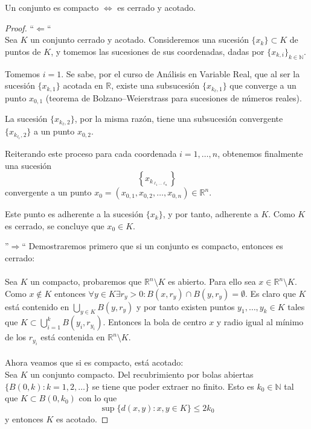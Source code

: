 \begin{teorema}
    Un conjunto es compacto $\iff$ es cerrado y acotado.
\end{teorema}
\begin{proof}
    ``$\Leftarrow$`` \\
    Sea \( K \) un conjunto cerrado y acotado. Consideremos una sucesión \( \{x_k\} \subset K \) de puntos de \( K \), y tomemos las sucesiones de sus coordenadas, dadas por \( \{x_{k,i}\}_{k \in \mathbb{N}} \). 

    Tomemos \( i = 1 \). Se sabe, por el curso de Análisis en Variable Real, que al ser la sucesión \( \{x_{k,1}\} \) acotada en \( \mathbb{R} \), existe una subsucesión \( \{x_{k_\ell,1}\} \) que converge a un punto \( x_{0,1} \) (teorema de Bolzano–Weierstrass para sucesiones de números reales).

    La sucesión \( \{x_{k_\ell,2}\} \), por la misma razón, tiene una subsucesión convergente \( \{x_{k_{\ell_r}, 2}\} \) a un punto \( x_{0,2} \).

    Reiterando este proceso para cada coordenada \( i = 1, \dots, n \), obtenemos finalmente una sucesión 
    \[
    \left\{x_{k_{\ell_1 \dots \ell_n}}\right\}
    \]
    convergente a un punto \( x_0 = (x_{0,1}, x_{0,2}, \ldots, x_{0,n}) \in \mathbb{R}^n \).

    Este punto es adherente a la sucesión \( \{x_k\} \), y por tanto, adherente a \( K \). Como \( K \) es cerrado, se concluye que \( x_0 \in K \).

    ''$\Rightarrow$`` 
    Demostraremos primero que si un conjunto es compacto, entonces es cerrado:     \\ \\
    Sea $K$ un compacto, probaremos que $\mathbb{R}^n \setminus K$ es abierto. Para ello sea $x \in \mathbb{R}^n \setminus K$. Como $x \notin K$ entonces $\forall y \in K \exists r_y > 0 : B(x, r_y) \cap B(y, r_y) = \emptyset$. Es claro que $K$ está contenido en $\bigcup_{y \in K} B(y, r_y)$ y por tanto existen puntos $y_1, \ldots, y_k \in K$ tales que $K \subset \bigcup_{i = 1}^{k} B(y_i, r_{y_i})$. Entonces la bola de centro $x$ y radio igual al mínimo de los $r_{y_i}$ está contenida en $\mathbb{R}^n \setminus K$. \\ \\
    Ahora veamos que si es compacto, está acotado: \\ 
    Sea $K$ un conjunto compacto. Del recubrimiento por bolas abiertas $\{B(0,k) : k = 1, 2, \ldots\}$ se tiene que poder extraer no finito. Esto es $k_0 \in \mathbb{N}$ tal que $K \subset B(0, k_0)$ con lo que
    $$\sup\{d(x,y) : x,y \in K\} \leq 2k_0$$
    y entonces $K$ es acotado.
\end{proof}

